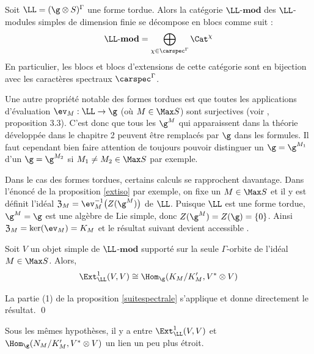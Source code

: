 \begin{Thm} Soit $\LL = (\g \otimes S)^\Gamma$ une forme tordue. Alors la catégorie $\LL$-$\mathbf{mod}$ des \linebreak $\LL$-modules simples de dimension finie se décompose en blocs comme suit :
$$ \text{$\LL$-$\mathbf{mod}$} = \bigoplus_{\chi \in \carspec^\Gamma} \Cat^\chi $$
En particulier, les blocs et blocs d'extensions de cette catégorie sont en bijection avec les caractères spectraux $\carspec^\Gamma$.
\end{Thm}

Une autre propriété notable des formes tordues est que toutes les applications d'évaluation $\ev_M : \LL \rightarrow \g$ (où $M \in \Max S$) sont surjectives (voir \cite{LPtfa}, proposition 3.3). C'est donc que tous les $\g^M$ qui apparaissent dans la théorie développée dans le chapitre 2 peuvent être remplacés par $\g$ dans les formules. Il faut cependant bien faire attention de toujours pouvoir distinguer un $\g = \g^{M_1}$ d'un $\g = \g^{M_2}$ si $M_1 \neq M_2 \in \Max S$ par exemple.

Dans le cas des formes tordues, certains calculs se rapprochent davantage. Dans l'énoncé de la proposition \ref{extiso} par exemple, on fixe un $M \in \Max S$ et il y est définit l'idéal \linebreak $\mathfrak{Z}_M = \ev_M^{-1}\big(Z(\g^M)\big)$ de $\LL$. Puisque $\LL$ est une forme tordue, $\g^M = \g$ est une algèbre de Lie simple, donc $Z(\g^M) = Z(\g) = \{0\}$. Ainsi $\mathfrak{Z}_M = \ker(\ev_M) = K_M$ et le résultat suivant devient accessible .

\begin{Prop} Soit $V$ un objet simple de $\LL$-$\mathbf{mod}$ supporté sur la seule $\Gamma$-orbite de l'idéal $M \in \Max S$. Alors, 
$$ \Ext_\LL^1(V,V) \cong \Hom_{\g}(K_M/K_M',V^* \otimes V) $$
\begin{pre} La partie (1) de la proposition \ref{suitespectrale} s'applique et donne directement le résultat. \qed
\end{pre} 
\end{Prop}

Sous les mêmes hypothèses, il y a entre $\Ext_\LL^1(V,V)$ et $\Hom_\g(N_M/K_M',V^* \otimes V)$ un lien un peu plus étroit. 

